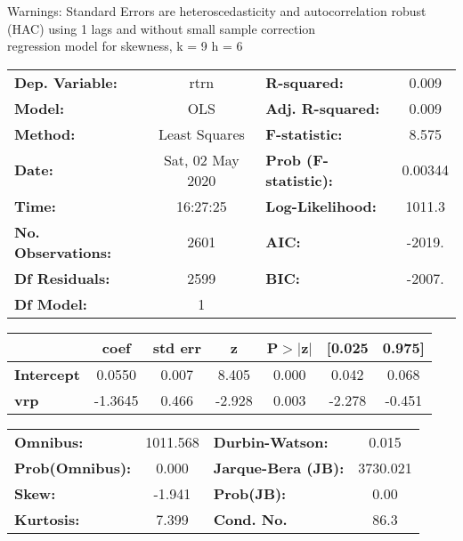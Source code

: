 Warnings: \newline
 [1] Standard Errors are heteroscedasticity and autocorrelation robust (HAC) using 1 lags and without small sample correction\\ 

regression model for skewness, k = 9 h = 6\begin{center}
\begin{tabular}{lclc}
\toprule
\textbf{Dep. Variable:}    &       rtrn       & \textbf{  R-squared:         } &     0.009   \\
\textbf{Model:}            &       OLS        & \textbf{  Adj. R-squared:    } &     0.009   \\
\textbf{Method:}           &  Least Squares   & \textbf{  F-statistic:       } &     8.575   \\
\textbf{Date:}             & Sat, 02 May 2020 & \textbf{  Prob (F-statistic):} &  0.00344    \\
\textbf{Time:}             &     16:27:25     & \textbf{  Log-Likelihood:    } &    1011.3   \\
\textbf{No. Observations:} &        2601      & \textbf{  AIC:               } &    -2019.   \\
\textbf{Df Residuals:}     &        2599      & \textbf{  BIC:               } &    -2007.   \\
\textbf{Df Model:}         &           1      & \textbf{                     } &             \\
\bottomrule
\end{tabular}
\begin{tabular}{lcccccc}
                   & \textbf{coef} & \textbf{std err} & \textbf{z} & \textbf{P$> |$z$|$} & \textbf{[0.025} & \textbf{0.975]}  \\
\midrule
\textbf{Intercept} &       0.0550  &        0.007     &     8.405  &         0.000        &        0.042    &        0.068     \\
\textbf{vrp}       &      -1.3645  &        0.466     &    -2.928  &         0.003        &       -2.278    &       -0.451     \\
\bottomrule
\end{tabular}
\begin{tabular}{lclc}
\textbf{Omnibus:}       & 1011.568 & \textbf{  Durbin-Watson:     } &    0.015  \\
\textbf{Prob(Omnibus):} &   0.000  & \textbf{  Jarque-Bera (JB):  } & 3730.021  \\
\textbf{Skew:}          &  -1.941  & \textbf{  Prob(JB):          } &     0.00  \\
\textbf{Kurtosis:}      &   7.399  & \textbf{  Cond. No.          } &     86.3  \\
\bottomrule
\end{tabular}
\end{center}

